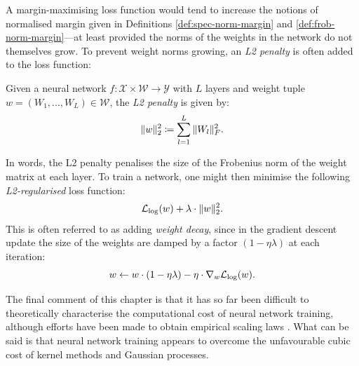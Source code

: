 \begin{refsection}
A margin-maximising loss function would tend to increase the notions of normalised margin given in Definitions \ref{def:spec-norm-margin} and \ref{def:frob-norm-margin}---at least provided the norms of the weights in the network do not themselves grow. To prevent weight norms growing, an \textit{L2 penalty} is often added to the loss function:
\begin{definition}[L2 penalty]\label{def:l2-penalty} Given a neural network $f:\mathcal{X}\times\mathcal{W}\to\mathcal{Y}$ with $L$ layers and weight tuple $w=(W_1, ..., W_L)\in\mathcal{W}$, the \textit{L2 penalty} is given by:
\begin{equation}
    \Vert {w} \Vert_2^2 \coloneqq \sum_{l=1}^L \Vert {W_l} \Vert_F^2.
\end{equation}
\end{definition}
In words, the L2 penalty penalises the size of the Frobenius norm of the weight matrix at each layer. To train a network, one might then minimise the following \textit{L2-regularised} loss function:
\begin{equation}
    \mathcal{L}_{\mathrm{log}}(w) + \lambda \cdot \|w\|_2^2.
\end{equation}
This is often referred to as adding \textit{weight decay}, since in the gradient descent update the size of the weights are damped by a factor $(1-\eta \lambda)$ at each iteration:
\begin{equation}
    w \gets w \cdot (1 - \eta\lambda) - \eta \cdot \nabla_w \mathcal{L}_\mathrm{log}(w).
\end{equation}

The final comment of this chapter is that it has so far been difficult to theoretically characterise the computational cost of neural network training, although efforts have been made to obtain empirical scaling laws \citep{scaling-laws}. What can be said is that neural network training appears to overcome the unfavourable cubic cost of kernel methods and Gaussian processes.

\printbibliography[heading=subbibliography]
\end{refsection}